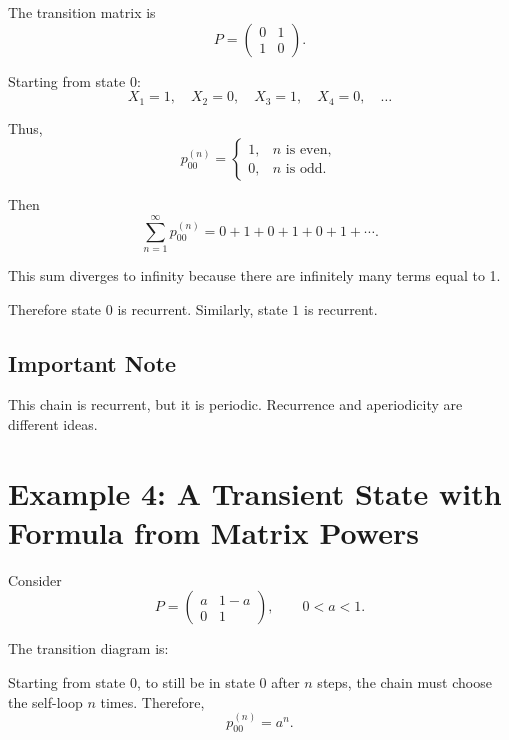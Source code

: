\documentclass[12pt,a4paper]{article}
\theoremstyle{notestyle}
\begin{document}
The transition matrix is
\[
P=
\begin{pmatrix}
0 & 1\\
1 & 0
\end{pmatrix}.
\]

Starting from state $0$:
\[
X_1=1,\quad X_2=0,\quad X_3=1,\quad X_4=0,\quad \ldots
\]

Thus,
\[
p_{00}^{(n)}
=
\begin{cases}
1, & n\text{ is even},\\
0, & n\text{ is odd}.
\end{cases}
\]

Then
\[
\sum_{n=1}^{\infty}p_{00}^{(n)}
=
0+1+0+1+0+1+\cdots.
\]

This sum diverges to infinity because there are infinitely many terms equal to 1.

Therefore state $0$ is recurrent. Similarly, state $1$ is recurrent.

\subsection{Important Note}

This chain is recurrent, but it is periodic. Recurrence and aperiodicity are different ideas.

\section{Example 4: A Transient State with Formula from Matrix Powers}

Consider
\[
P=
\begin{pmatrix}
a & 1-a\\
0 & 1
\end{pmatrix},
\qquad 0<a<1.
\]

The transition diagram is:

\begin{center}
\end{center}

Starting from state $0$, to still be in state $0$ after $n$ steps, the chain must choose the self-loop $n$ times. Therefore,
\[
p_{00}^{(n)}=a^n.
\]
\end{document}
